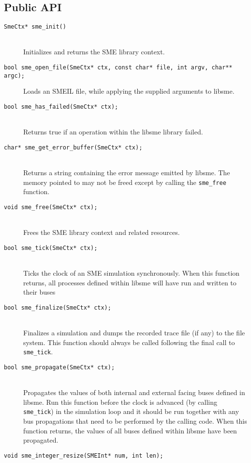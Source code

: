 \subsection{Public API}
\begin{description}
\item[\texttt{SmeCtx* sme\_init()}]\hfill\\
   Initializes and returns the SME library context.
\item[\texttt{bool sme_open_file(SmeCtx* ctx, const char* file, int argv, char**
    argc);}]\hfill
     Loads an SMEIL file, while applying the supplied arguments to libsme.
\item[\texttt{bool sme_has_failed(SmeCtx* ctx);}]\hfill\\
   Returns true if an operation within the libsme library failed.
 \item[\texttt{char* sme_get_error_buffer(SmeCtx* ctx);}]\hfill\\
   Returns a string containing the error message emitted by libsme. The memory
   pointed to may not be freed except by calling the \texttt{sme_free} function.
 \item[\texttt{void sme_free(SmeCtx* ctx);}]\hfill\\
   Frees the SME library context and related resources.
 \item[\texttt{bool sme_tick(SmeCtx* ctx);}]\hfill\\
   Ticks the clock of an SME simulation synchronously. When this function
   returns, all processes defined within libsme will have run and written to
   their buses
 \item[\texttt{bool sme_finalize(SmeCtx* ctx);}]\hfill\\
   Finalizes a simulation and dumps the recorded trace file (if any) to the file
   system. This function should always be called following the final call to
   \texttt{sme_tick}.
 \item[\texttt{bool sme_propagate(SmeCtx* ctx);}]\hfill\\
   Propagates the values of both internal and external facing buses defined in
   libsme. Run this function before the clock is advanced (by calling
   \texttt{sme_tick}) in the simulation loop and it should be run together with
   any bus propagations that need to be performed by the calling code. When this
   function returns, the values of all buses defined within libsme have been
   propagated.
 \item[\texttt{void sme_integer_resize(SMEInt* num, int len);}]\hfill\\

\end{description}
